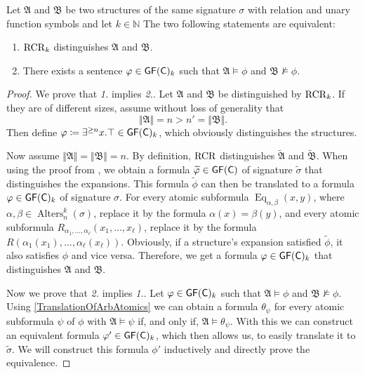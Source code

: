 \begin{theorem}
	\label{thm:ThmB}
	Let $\mathfrak A$ and $\mathfrak B$ be two structures of the same signature $\sigma$ with relation and unary function symbols and let $k\in \mathbb{N}$
	The two following statements are equivalent:
	\begin{enumerate}
		\item $\operatorname{RCR}_k$ distinguishes $\mathfrak A$ and $\mathfrak B$.
		\item There exists a sentence $\varphi\in\mathsf{GF}(\mathsf{C})_k$ such that $\mathfrak A\models \phi$ and $\mathfrak B\not\models \phi$.
	\end{enumerate}
\end{theorem}
\begin{proof}
	We prove that \emph{1.} implies \emph{2.}. 
	Let $\mathfrak A$ and $\mathfrak B$ be distinguished by $\operatorname{RCR}_k$.
	If they are of different sizes, assume without loss of generality that 
	$$\Vert \mathfrak A \Vert =n > n'=\Vert \mathfrak B \Vert.$$
	Then define $\varphi\coloneqq \exists^{\geq n} x. \top\in \mathsf{GF}(\mathsf{C})_k$, which obviously distinguishes the structures.
	
	Now assume $\Vert \mathfrak A\Vert = \Vert \mathfrak B \Vert = n$.
	By definition, $\operatorname{RCR}$ distinguishes $\widetilde{\mathfrak A}$ and $\widetilde{\mathfrak B}$.
	When using the proof from \cite{scheidt2025ColorRefinement}, we obtain a formula $\widetilde{\varphi}\in \mathsf{GF}(\mathsf{C})$ of signature $\widetilde{\sigma}$ that distinguishes the expansions.
	This formula $\widetilde{\phi}$ can then be translated to a formula $\varphi\in\mathsf{GF}(\mathsf{C})_k$ of signature $\sigma$.
	For every atomic subformula $\operatorname{Eq}_{\alpha,\beta}(x,y)$, where $\alpha,\beta\in \operatorname{Alters}_n^k(\sigma)$, replace it by the formula $\alpha(x)=\beta(y)$,
	and every atomic subformula $R_{\alpha_1,\dots,\alpha_\ell}(x_1,\dots,x_\ell)$, replace it by the formula $R(\alpha_1(x_1),\dots,\alpha_\ell(x_\ell))$.
	Obviously, if a structure's expansion satisfied $\widetilde{\phi}$, it also satisfies $\phi$ and vice versa.
	Therefore, we get a formula $\varphi\in \mathsf{GF}(\mathsf{C})_k$ that distinguishes $\mathfrak A$ and $\mathfrak B$.
	
	Now we prove that \emph{2.} implies \emph{1.}.
	Let $\varphi\in \mathsf{GF}(\mathsf{C})_k$ such that $\mathfrak A\models \phi$ and $\mathfrak B\not\models \phi$.
	Using \cref{TranslationOfArbAtomics} we can obtain a formula $\theta_\psi$ for every atomic subformula $\psi$ of $\phi$ with $\mathfrak A\models \psi$ if, and only if, $\mathfrak A\models \theta_\psi$.
	With this we can construct an equivalent formula $\varphi'\in\mathsf{GF}(\mathsf{C})_k$, which then allows us, to easily translate it to $\widetilde{\sigma}$.
	We will construct this formula $\phi'$ inductively and directly prove the equivalence.
	

\end{proof}
